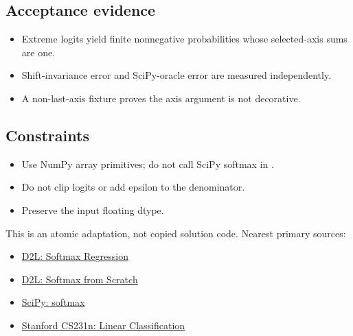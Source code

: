         \subsection{Acceptance evidence}

        \begin{evidencebox}
        \begin{itemize}
          \item Extreme logits yield finite nonnegative probabilities whose selected-axis sums are one.
  \item Shift-invariance error and SciPy-oracle error are measured independently.
  \item A non-last-axis fixture proves the axis argument is not decorative.
        \end{itemize}
        \end{evidencebox}

        \subsection{Constraints}

        \begin{itemize}
          \item Use NumPy array primitives; do not call SciPy softmax in .
  \item Do not clip logits or add epsilon to the denominator.
  \item Preserve the input floating dtype.
        \end{itemize}

        \begin{sourcebox}
        This is an atomic adaptation, not copied solution code. Nearest primary sources:
        \begin{itemize}
          \item \href{https://d2l.ai/chapter_linear-classification/softmax-regression.html}{D2L: Softmax Regression}
  \item \href{https://d2l.ai/chapter_linear-classification/softmax-regression-scratch.html}{D2L: Softmax from Scratch}
  \item \href{https://docs.scipy.org/doc/scipy/reference/generated/scipy.special.softmax.html}{SciPy: softmax}
  \item \href{https://cs231n.github.io/linear-classify/}{Stanford CS231n: Linear Classification}
        \end{itemize}
        \end{sourcebox}
